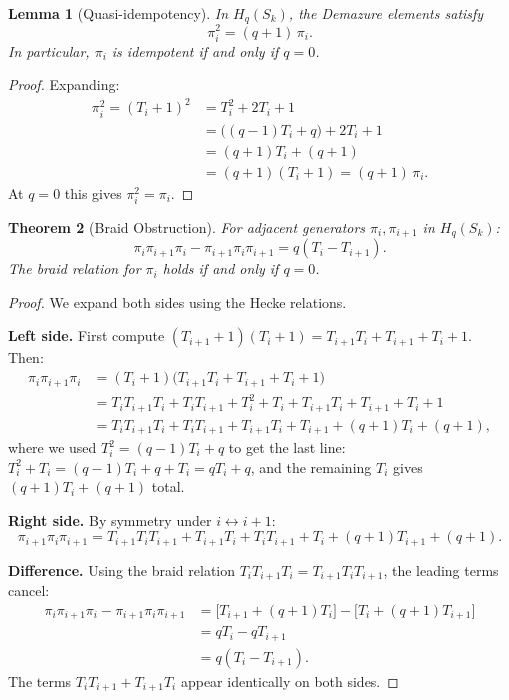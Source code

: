 \documentclass[11pt]{article}
\newtheorem{theorem}{Theorem}
\newtheorem{lemma}[theorem]{Lemma}
\theoremstyle{definition}
\theoremstyle{remark}
\begin{document}
\begin{lemma}[Quasi-idempotency]\label{lem:quasi-idem}
In $H_q(S_k)$, the Demazure elements satisfy
\[
\pi_i^2 = (q+1)\,\pi_i.
\]
In particular, $\pi_i$ is idempotent if and only if $q = 0$.
\end{lemma}

\begin{proof}
Expanding:
\begin{align*}
\pi_i^2 = (T_i + 1)^2 &= T_i^2 + 2T_i + 1 \\
&= \bigl((q-1)T_i + q\bigr) + 2T_i + 1 \\
&= (q+1)T_i + (q+1) \\
&= (q+1)(T_i + 1) = (q+1)\,\pi_i.
\end{align*}
At $q = 0$ this gives $\pi_i^2 = \pi_i$.
\end{proof}

\begin{theorem}[Braid Obstruction]\label{thm:braid-obstruction}
For adjacent generators $\pi_i, \pi_{i+1}$ in $H_q(S_k)$:
\begin{equation}\label{eq:braid-obs}
\pi_i \pi_{i+1} \pi_i - \pi_{i+1} \pi_i \pi_{i+1} = q(T_i - T_{i+1}).
\end{equation}
The braid relation for $\pi_i$ holds if and only if $q = 0$.
\end{theorem}

\begin{proof}
We expand both sides using the Hecke relations.

\medskip\noindent\textbf{Left side.}
First compute $(T_{i+1}+1)(T_i+1) = T_{i+1}T_i + T_{i+1} + T_i + 1$.
Then:
\begin{align*}
\pi_i\pi_{i+1}\pi_i
&= (T_i + 1)\bigl(T_{i+1}T_i + T_{i+1} + T_i + 1\bigr) \\
&= T_i T_{i+1} T_i + T_i T_{i+1} + T_i^2 + T_i
   + T_{i+1}T_i + T_{i+1} + T_i + 1 \\
&= T_i T_{i+1} T_i + T_i T_{i+1} + T_{i+1}T_i + T_{i+1} + (q+1)T_i + (q+1),
\end{align*}
where we used $T_i^2 = (q-1)T_i + q$ to get the last line:
$T_i^2 + T_i = (q-1)T_i + q + T_i = qT_i + q$, and the remaining $T_i$
gives $(q+1)T_i + (q+1)$ total.

\medskip\noindent\textbf{Right side.}
By symmetry under $i \leftrightarrow i+1$:
\[
\pi_{i+1}\pi_i\pi_{i+1}
= T_{i+1}T_i T_{i+1} + T_{i+1}T_i + T_i T_{i+1} + T_i + (q+1)T_{i+1} + (q+1).
\]

\medskip\noindent\textbf{Difference.}
Using the braid relation $T_iT_{i+1}T_i = T_{i+1}T_iT_{i+1}$, the
leading terms cancel:
\begin{align*}
\pi_i\pi_{i+1}\pi_i - \pi_{i+1}\pi_i\pi_{i+1}
&= \bigl[T_{i+1} + (q+1)T_i\bigr] - \bigl[T_i + (q+1)T_{i+1}\bigr] \\
&= qT_i - qT_{i+1} \\
&= q(T_i - T_{i+1}).
\end{align*}
The terms $T_iT_{i+1} + T_{i+1}T_i$ appear identically on both sides.
\end{proof}
\end{document}
